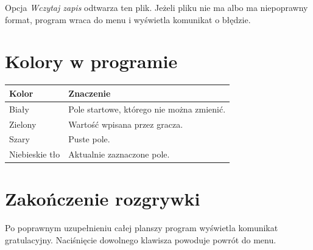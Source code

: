 \documentclass[12pt,a4paper]{article}
\begin{document}
Opcja \textit{Wczytaj zapis} odtwarza ten plik. Jeżeli pliku nie ma albo ma
niepoprawny format, program wraca do menu i wyświetla komunikat o błędzie.

\section{Kolory w programie}

\begin{longtable}{p{}p{}}
\textbf{Kolor} & \textbf{Znaczenie} \\
\hline
Biały & Pole startowe, którego nie można zmienić. \\
Zielony & Wartość wpisana przez gracza. \\
Szary & Puste pole. \\
Niebieskie tło & Aktualnie zaznaczone pole. \\
\end{longtable}

\section{Zakończenie rozgrywki}

Po poprawnym uzupełnieniu całej planszy program wyświetla komunikat
gratulacyjny. Naciśnięcie dowolnego klawisza powoduje powrót do menu.
\end{document}
